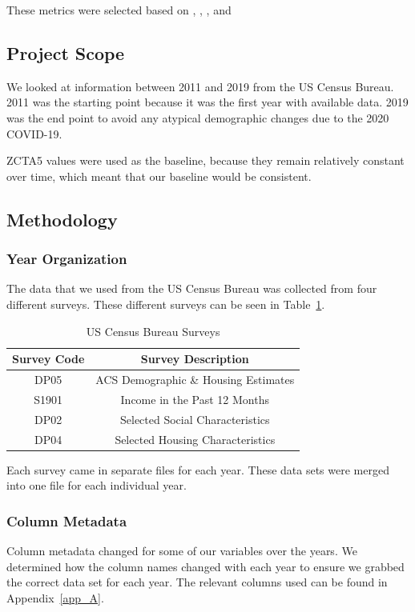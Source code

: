 \documentclass[conference]{IEEEtran}
\begin{document}
These metrics were selected based on \cite{b1}, \cite{b2}, \cite{b3}, and \cite{b4}

\subsection{Project Scope}
We looked at information between 2011 and 2019 from the US Census Bureau. 2011 was the starting point because it was the first year with available data. 2019 was the end point to avoid any atypical demographic changes due to the 2020 COVID-19.

ZCTA5 values were used as the baseline, because they remain relatively constant over time, which meant that our baseline would be consistent.

\subsection{Methodology}

\subsubsection{Year Organization}
The data that we used from the US Census Bureau was collected from four different surveys. These different surveys can be seen in Table~\ref{surveys}.
\begin{table}[htbp]
\caption{US Census Bureau Surveys}
\begin{center}
\begin{tabular}{cc}
\hline\hline
\textbf{Survey Code} & \textbf{Survey Description} \\
\hline
DP05 & ACS Demographic \& Housing Estimates\\
S1901 & Income in the Past 12 Months\\
DP02 & Selected Social Characteristics\\
DP04 & Selected Housing Characteristics\\
\hline\hline
\end{tabular}
\label{surveys}
\end{center}
\end{table}
Each survey came in separate files for each year. These data sets were merged into one file for each individual year. 

\subsubsection{Column Metadata}
Column metadata changed for some of our variables over the years. We determined how the column names changed with each year to ensure we grabbed the correct data set for each year. The relevant columns used can be found in Appendix~\ref{app_A}.
\end{document}
